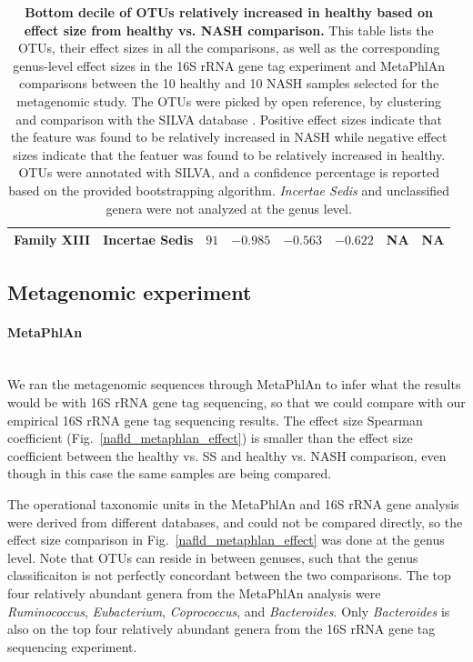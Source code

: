 \begin{table}[!ht]
\begin{tiny}
\begin{tabular}{|l|l|l|l|l|l|l|l|}
Family XIII & Incertae Sedis & $91$ & $-0.985$ & $-0.563$ & $-0.622$ & NA & NA \\ \hline
\end{tabular}
\end{tiny}
\caption{ \textbf{Bottom decile of OTUs relatively increased in healthy based on effect size from healthy vs. NASH comparison.} This table lists the OTUs, their effect sizes in all the comparisons, as well as the corresponding genus-level effect sizes in the 16S rRNA gene tag experiment and MetaPhlAn comparisons between the 10 healthy and 10 NASH samples selected for the metagenomic study. The OTUs were picked by open reference, by clustering and comparison with the SILVA database \cite{quast2013silva}. Positive effect sizes indicate that the feature was found to be relatively increased in NASH while negative effect sizes indicate that the featuer was found to be relatively increased in healthy. OTUs were annotated with SILVA, and a confidence percentage is reported based on the provided bootstrapping algorithm. \textit{Incertae Sedis} and unclassified genera were not analyzed at the genus level.}
\label{nafld_bot_otu_table}
\end{table}


\FloatBarrier

\subsection{Metagenomic experiment}

\paragraph{MetaPhlAn}\mbox{}\\

We ran the metagenomic sequences through MetaPhlAn to infer what the results would be with 16S rRNA gene tag sequencing, so that we could compare with our empirical 16S rRNA gene tag sequencing results. The effect size Spearman coefficient (Fig.~\ref{nafld_metaphlan_effect}) is smaller than the effect size coefficient between the healthy vs. SS and healthy vs. NASH comparison, even though in this case the same samples are being compared.

The operational taxonomic units in the MetaPhlAn and 16S rRNA gene analysis were derived from different databases, and could not be compared directly, so the effect size comparison in Fig.~\ref{nafld_metaphlan_effect} was done at the genus level. Note that OTUs can reside in between genuses, such that the genus classificaiton is not perfectly concordant between the two comparisons. The top four relatively abundant genera from the MetaPhlAn analysis were \textit{Ruminococcus}, \textit{Eubacterium}, \textit{Coprococcus}, and \textit{Bacteroides}. Only \textit{Bacteroides} is also on the top four relatively abundant genera from the 16S rRNA gene tag sequencing experiment.

